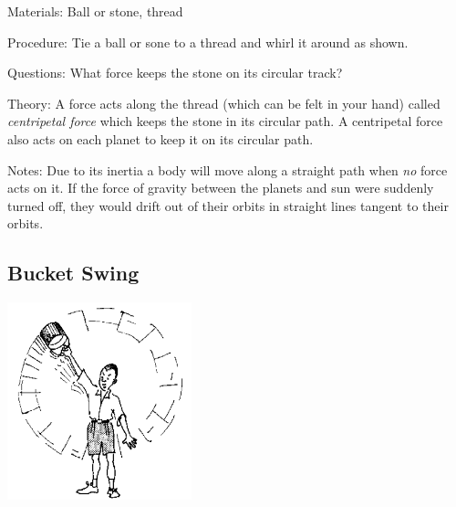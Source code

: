 \begin{multicols}{2}
\begin{description*}
\item[Materials:]{Ball or stone, thread}
\item[Procedure:]{Tie a ball or sone to a thread and whirl it around as shown.}
\item[Questions:]{What force keeps the stone on its circular track?}
\item[Theory:]{A force acts along the thread (which can be felt in your hand) called \emph{centripetal force} which keeps the stone in its circular path. A centripetal force also acts on each planet to keep it on its circular path.}
\item[Notes:]{Due to its inertia a body will move along a straight path when \emph{no} force acts on it. If the force of gravity between the planets and sun were suddenly turned off, they would drift out of their orbits in straight lines tangent to their orbits.}
\end{description*}

\columnbreak

\subsection{Bucket Swing}

\begin{center}
\includegraphics[width=0.4\textwidth]{./img/source/bucket-swing.png}
\end{center}


\end{multicols}
